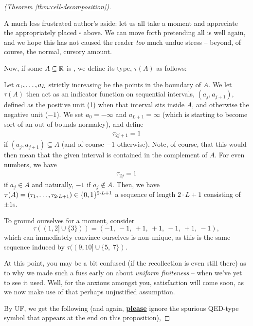 \begin{proof}[\CD (Theorem \ref{thm:cell-decomposition})]
  \begin{svgraybox}
    A much less frustrated author's aside: let us all take a moment and appreciate the appropriately placed $\square$ above. We can move forth pretending all is well again, and we hope this has not caused the reader \emph{too} much undue stress -- beyond, of course, the normal, cursory amount.
  \end{svgraybox}

  Now, if some $A \subseteq \mathbb{R}$ is , we define its type, $\tau(A)$ as follows:
  \begin{description}
    \item Let $a_1, \hdots, a_{L}$ strictly increasing be the points in the boundary of $A$. We let $\tau(A)$ then act as an indicator function on sequential intervals, $(a_j, a_{j+1})$, defined as the positive unit (1) when that interval sits inside $A$, and otherwise the negative unit ($-1$). We set $a_0 = - \infty$ and $a_{L+1} = \infty$ (which is starting to become sort of an out-of-bounds normalcy), and define
    \begin{align*}
      \tau_{2j + 1} = 1
    \end{align*}
    if $(a_j, a_{j+1}) \subseteq A$ (and of course $-1$ otherwise). Note, of course, that this would then mean that the given interval is contained in the complement of $A$. For even numbers, we have
    \begin{align*}
      \tau_{2j} = 1
    \end{align*}
    if $a_j \in A$ and naturally, $-1$ if $a_j \not\in A$. Then, we have $\tau(A) = (\tau_1, \hdots, \tau_{2 \cdot L + 1}) \in \{0, 1\}^{2 \cdot L + 1}$ a sequence of length $2 \cdot L + 1$ consisting of $\pm 1$s.

  \end{description}

    To ground ourselves for a moment, consider $$\tau((1, 2] \cup \{ 3 \} )) = (-1,\ -1,\ +1,\ +1,\ -1,\ +1,\ -1),$$
    which can immediately convince ourselves is non-unique, as this is the same sequence induced by $\tau((9, 10] \cup \{5,\ 7\} )$.

    At this point, you may be a bit confused (if the recollection is even still there) as to why we made such a fuss early on about \emph{uniform finiteness} -- when we've yet to see it used. Well, for the anxious amongst you, satisfaction will come soon, as we now make use of that perhaps unjustified assumption.

    By UF, we get the following (and again, \underline{\textbf{please}} ignore the spurious QED-type symbol that appears at the end on this proposition),


\end{proof}
